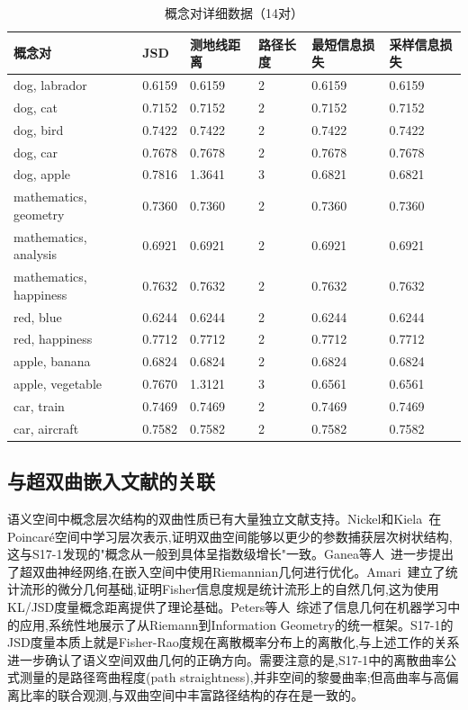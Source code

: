 \documentclass[
 UTF8,
 fontset=mac,
]{ctexart}
\begin{document}
\begin{table}[htbp]
\centering
\caption{概念对详细数据（14对）}
\begin{tabular}{llllll}
\toprule
概念对 & JSD & 测地线距离 & 路径长度 & 最短信息损失 & 采样信息损失 \\
\midrule
dog, labrador & 0.6159 & 0.6159 & 2 & 0.6159 & 0.6159 \\
dog, cat & 0.7152 & 0.7152 & 2 & 0.7152 & 0.7152 \\
dog, bird & 0.7422 & 0.7422 & 2 & 0.7422 & 0.7422 \\
dog, car & 0.7678 & 0.7678 & 2 & 0.7678 & 0.7678 \\
dog, apple & 0.7816 & 1.3641 & 3 & 0.6821 & 0.6821 \\
mathematics, geometry & 0.7360 & 0.7360 & 2 & 0.7360 & 0.7360 \\
mathematics, analysis & 0.6921 & 0.6921 & 2 & 0.6921 & 0.6921 \\
mathematics, happiness & 0.7632 & 0.7632 & 2 & 0.7632 & 0.7632 \\
red, blue & 0.6244 & 0.6244 & 2 & 0.6244 & 0.6244 \\
red, happiness & 0.7712 & 0.7712 & 2 & 0.7712 & 0.7712 \\
apple, banana & 0.6824 & 0.6824 & 2 & 0.6824 & 0.6824 \\
apple, vegetable & 0.7670 & 1.3121 & 3 & 0.6561 & 0.6561 \\
car, train & 0.7469 & 0.7469 & 2 & 0.7469 & 0.7469 \\
car, aircraft & 0.7582 & 0.7582 & 2 & 0.7582 & 0.7582 \\
\bottomrule
\end{tabular}
\end{table}

\subsection{与超双曲嵌入文献的关联}\label{hyperbolic-embeddings}

语义空间中概念层次结构的双曲性质已有大量独立文献支持。Nickel和Kiela~\cite{nickel-kiela-2017}在Poincaré空间中学习层次表示,证明双曲空间能够以更少的参数捕获层次树状结构,这与S17-1发现的"概念从一般到具体呈指数级增长"一致。Ganea等人~\cite{ganea-2018}进一步提出了超双曲神经网络,在嵌入空间中使用Riemannian几何进行优化。Amari~\cite{amari-1985}建立了统计流形的微分几何基础,证明Fisher信息度规是统计流形上的自然几何,这为使用KL/JSD度量概念距离提供了理论基础。Peters等人~\cite{peters-2016}综述了信息几何在机器学习中的应用,系统性地展示了从Riemann到Information Geometry的统一框架。S17-1的JSD度量本质上就是Fisher-Rao度规在离散概率分布上的离散化,与上述工作的关系进一步确认了语义空间双曲几何的正确方向。需要注意的是,S17-1中的离散曲率公式测量的是路径弯曲程度(path straightness),并非空间的黎曼曲率;但高曲率与高偏离比率的联合观测,与双曲空间中丰富路径结构的存在是一致的。
\end{document}
